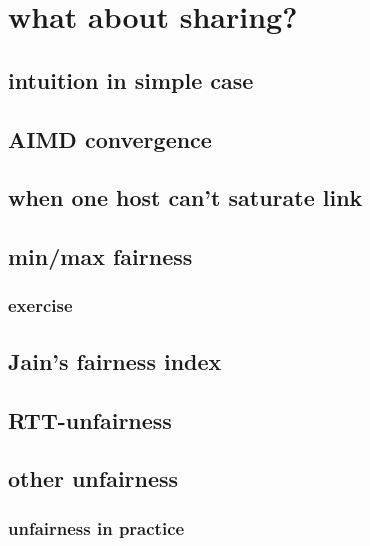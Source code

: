 

\section{what about sharing?}


\subsection{intuition in simple case}


\subsection{AIMD convergence}




\subsection{when one host can't saturate link}


\subsection{min/max fairness}


\subsubsection{exercise}


\subsection{Jain's fairness index}


\subsection{RTT-unfairness}


\subsection{other unfairness}


\subsubsection{unfairness in practice}

